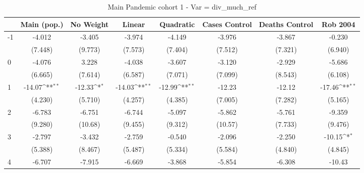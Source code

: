 \documentclass{article}
\begin{document}
{
\def\sym#1{\ifmmode^{#1}\else\(^{#1}\)\fi}
\begin{longtable}{l*{7}{c}}
\caption{Main Pandemic cohort 1 - Var = div\_much\_ref}\\
\hline\hline\endfirsthead\hline\endhead\hline\endfoot\endlastfoot
                &\multicolumn{1}{c}{Main (pop.)}&\multicolumn{1}{c}{No Weight}&\multicolumn{1}{c}{Linear}&\multicolumn{1}{c}{Quadratic}&\multicolumn{1}{c}{Cases Control}&\multicolumn{1}{c}{Deaths Control}&\multicolumn{1}{c}{Rob 2004}\\
\hline
-1              &   -4.012         &   -3.405         &   -3.974         &   -4.149         &   -3.976         &   -3.867         &   -0.230         \\
                &  (7.448)         &  (9.773)         &  (7.573)         &  (7.404)         &  (7.512)         &  (7.321)         &  (6.940)         \\
0               &   -4.076         &    3.228         &   -4.038         &   -3.607         &   -3.120         &   -2.929         &   -5.686         \\
                &  (6.665)         &  (7.614)         &  (6.587)         &  (7.071)         &  (7.099)         &  (8.543)         &  (6.108)         \\
1               &   -14.07\sym{**} &   -12.33\sym{*}  &   -14.03\sym{**} &   -12.99\sym{**} &   -12.23         &   -12.12         &   -17.46\sym{**} \\
                &  (4.230)         &  (5.710)         &  (4.257)         &  (4.385)         &  (7.005)         &  (7.282)         &  (5.165)         \\
2               &   -6.783         &   -6.751         &   -6.744         &   -5.097         &   -5.862         &   -5.761         &   -9.359         \\
                &  (9.280)         &  (10.68)         &  (9.455)         &  (9.312)         &  (10.57)         &  (7.733)         &  (9.476)         \\
3               &   -2.797         &   -3.432         &   -2.759         &   -0.540         &   -2.096         &   -2.250         &   -10.15\sym{*}  \\
                &  (5.388)         &  (8.467)         &  (5.487)         &  (5.334)         &  (5.584)         &  (4.840)         &  (4.845)         \\
4               &   -6.707         &   -7.915         &   -6.669         &   -3.868         &   -5.854         &   -6.308         &   -10.43         \\

\end{longtable}}
\end{document}

